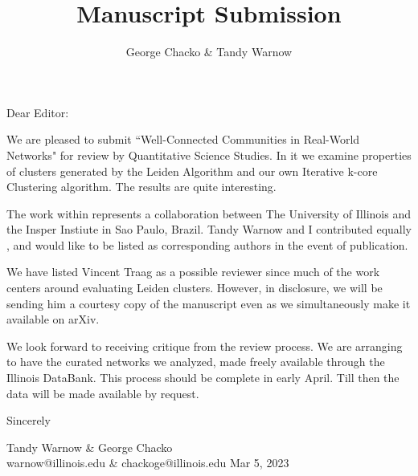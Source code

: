 \documentclass[11pt, oneside]{article}   	%
\title{Manuscript Submission}
\author{George Chacko & Tandy Warnow}
\begin{document}

\noindent
Dear Editor:
\vspace{10mm}

We are pleased to submit ``Well-Connected Communities in Real-World Networks" for review by Quantitative Science Studies. In it we examine properties of clusters generated by the Leiden Algorithm and our own Iterative k-core Clustering algorithm. The results are quite interesting.

\vspace{3mm}

The work within represents a collaboration between The University of Illinois and the Insper Instiute in Sao Paulo, Brazil.  Tandy Warnow and I contributed equally , and would like to be listed as corresponding authors in the event of publication.


\vspace{3mm}

We have listed Vincent Traag as a possible reviewer since much of the work centers around evaluating Leiden clusters. However, in disclosure, we will be sending him a courtesy copy of the manuscript even as we simultaneously make it available on arXiv. 
\vspace{3mm}


We look forward to receiving critique from the review process. We are arranging to have the curated networks we analyzed, made freely available through the Illinois DataBank. This process should be complete in early April. Till then the data 
will be made available by request.

\vspace{3mm}
\noindent
Sincerely


\vspace{8
mm}
\noindent
Tandy Warnow \& George Chacko\\
\noindent
warnow@illinois.edu \& chackoge@illinois.edu
Mar 5, 2023
\end{document}
